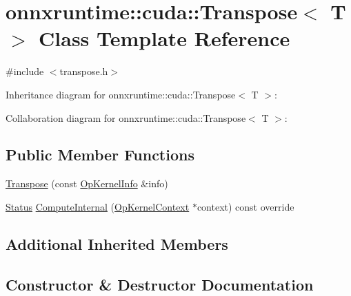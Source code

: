 \hypertarget{classonnxruntime_1_1cuda_1_1Transpose}{}\section{onnxruntime\+:\+:cuda\+:\+:Transpose$<$ T $>$ Class Template Reference}
\label{classonnxruntime_1_1cuda_1_1Transpose}


{\ttfamily \#include $<$transpose.\+h$>$}



Inheritance diagram for onnxruntime\+:\+:cuda\+:\+:Transpose$<$ T $>$\+:


Collaboration diagram for onnxruntime\+:\+:cuda\+:\+:Transpose$<$ T $>$\+:
\subsection*{Public Member Functions}
\begin{DoxyCompactItemize}
\item 
\mbox{\hyperlink{classonnxruntime_1_1cuda_1_1Transpose_a39f98b1f6790259662e2af8653ed984d}{Transpose}} (const \mbox{\hyperlink{classonnxruntime_1_1OpKernelInfo}{Op\+Kernel\+Info}} \&info)
\item 
\mbox{\hyperlink{classonnxruntime_1_1common_1_1Status}{Status}} \mbox{\hyperlink{classonnxruntime_1_1cuda_1_1Transpose_a02f1e4c35b31f521b2bcafdc2a81128b}{Compute\+Internal}} (\mbox{\hyperlink{classonnxruntime_1_1OpKernelContext}{Op\+Kernel\+Context}} $\ast$context) const override
\end{DoxyCompactItemize}
\subsection*{Additional Inherited Members}


\subsection{Constructor \& Destructor Documentation}
\mbox{\label{classonnxruntime_1_1cuda_1_1Transpose_a39f98b1f6790259662e2af8653ed984d}} 
